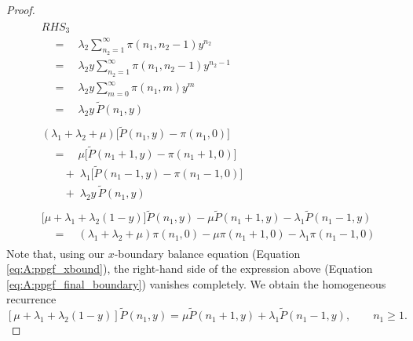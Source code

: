 \begin{proof}
\begin{align}
        \begin{split}
            & RHS_3 \\
            & \quad = \quad \lambda_2\sum_{n_2=1}^{\infty}\pi(n_1,n_2-1)y^{n_2} \\
            & \quad = \quad \lambda_2 y \sum_{n_2=1}^{\infty}\pi(n_1,n_2-1)y^{n_2-1} \\
            & \quad = \quad \lambda_2 y \sum_{m=0}^{\infty}\pi(n_1,m)y^{m} \\
            & \quad = \quad \lambda_2 y \, \widetilde{P}(n_1,y)
        \end{split} \nonumber \\
        \begin{split}
            & (\lambda_1+\lambda_2+\mu)\bigl[\widetilde{P}(n_1,y)-\pi(n_1,0)\bigr] \\
            & \quad = \quad \mu\bigl[\widetilde{P}(n_1+1,y)-\pi(n_1+1,0)\bigr] \\
            & \quad \quad + \; \lambda_1\bigl[\widetilde{P}(n_1-1,y)-\pi(n_1-1,0)\bigr] \\
            & \quad \quad + \; \lambda_2 y\,\widetilde{P}(n_1,y)
        \end{split} \nonumber \\
        \begin{split}
            & \bigl[\mu+\lambda_1+\lambda_2(1-y)\bigr]\widetilde{P}(n_1,y) -\mu\widetilde{P}(n_1+1,y)-\lambda_1\widetilde{P}(n_1-1,y) \\
            & \quad = \quad (\lambda_1+\lambda_2+\mu)\pi(n_1,0) -\mu\pi(n_1+1,0)-\lambda_1\pi(n_1-1,0)
        \end{split}
        \label{eq:A:ppgf_final_boundary}
    \end{align}
    Note that, using our $x$-boundary balance equation (Equation \eqref{eq:A:ppgf_xbound}), the right-hand side of the expression above (Equation \eqref{eq:A:ppgf_final_boundary}) vanishes completely. We obtain the homogeneous recurrence 
    \begin{equation}
        \left[ \mu + \lambda_1 + \lambda_2 (1-y) \right] \widetilde{P}(n_1,y)
        = \mu \widetilde{P}(n_1+1,y)
        + \lambda_1 \widetilde{P}(n_1-1,y),
        \qquad n_1\geq1.
        \label{eq:A:ppgf_recurrence}
    \end{equation}
    

\end{proof}
